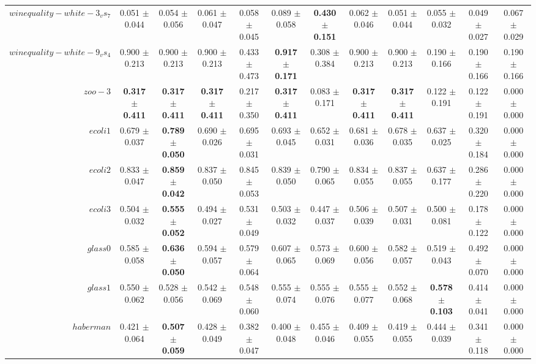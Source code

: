 \begin{table}[!ht]
{\begin{tabular}{r c c c c c c c c c c c}
$winequality-white-3_vs_7$ & 0.051 $\pm$ 0.044 & 0.054 $\pm$ 0.056 & 0.061 $\pm$ 0.047 & 0.058 $\pm$ 0.045 & 0.089 $\pm$ 0.058 & \textbf{0.430 $\pm$ 0.151} & 0.062 $\pm$ 0.046 & 0.051 $\pm$ 0.044 & 0.055 $\pm$ 0.032 & 0.049 $\pm$ 0.027 & 0.067 $\pm$ 0.029 \\
$winequality-white-9_vs_4$ & 0.900 $\pm$ 0.213 & 0.900 $\pm$ 0.213 & 0.900 $\pm$ 0.213 & 0.433 $\pm$ 0.473 & \textbf{0.917 $\pm$ 0.171} & 0.308 $\pm$ 0.384 & 0.900 $\pm$ 0.213 & 0.900 $\pm$ 0.213 & 0.190 $\pm$ 0.166 & 0.190 $\pm$ 0.166 & 0.190 $\pm$ 0.166 \\
$zoo-3$ & \textbf{0.317 $\pm$ 0.411} & \textbf{0.317 $\pm$ 0.411} & \textbf{0.317 $\pm$ 0.411} & 0.217 $\pm$ 0.350 & \textbf{0.317 $\pm$ 0.411} & 0.083 $\pm$ 0.171 & \textbf{0.317 $\pm$ 0.411} & \textbf{0.317 $\pm$ 0.411} & 0.122 $\pm$ 0.191 & 0.122 $\pm$ 0.191 & 0.000 $\pm$ 0.000 \\
$ecoli1$ & 0.679 $\pm$ 0.037 & \textbf{0.789 $\pm$ 0.050} & 0.690 $\pm$ 0.026 & 0.695 $\pm$ 0.031 & 0.693 $\pm$ 0.045 & 0.652 $\pm$ 0.031 & 0.681 $\pm$ 0.036 & 0.678 $\pm$ 0.035 & 0.637 $\pm$ 0.025 & 0.320 $\pm$ 0.184 & 0.000 $\pm$ 0.000 \\
$ecoli2$ & 0.833 $\pm$ 0.047 & \textbf{0.859 $\pm$ 0.042} & 0.837 $\pm$ 0.050 & 0.845 $\pm$ 0.053 & 0.839 $\pm$ 0.050 & 0.790 $\pm$ 0.065 & 0.834 $\pm$ 0.055 & 0.837 $\pm$ 0.055 & 0.637 $\pm$ 0.177 & 0.286 $\pm$ 0.220 & 0.000 $\pm$ 0.000 \\
$ecoli3$ & 0.504 $\pm$ 0.032 & \textbf{0.555 $\pm$ 0.052} & 0.494 $\pm$ 0.027 & 0.531 $\pm$ 0.049 & 0.503 $\pm$ 0.032 & 0.447 $\pm$ 0.037 & 0.506 $\pm$ 0.039 & 0.507 $\pm$ 0.031 & 0.500 $\pm$ 0.081 & 0.178 $\pm$ 0.122 & 0.000 $\pm$ 0.000 \\
$glass0$ & 0.585 $\pm$ 0.058 & \textbf{0.636 $\pm$ 0.050} & 0.594 $\pm$ 0.057 & 0.579 $\pm$ 0.064 & 0.607 $\pm$ 0.065 & 0.573 $\pm$ 0.069 & 0.600 $\pm$ 0.056 & 0.582 $\pm$ 0.057 & 0.519 $\pm$ 0.043 & 0.492 $\pm$ 0.070 & 0.000 $\pm$ 0.000 \\
$glass1$ & 0.550 $\pm$ 0.062 & 0.528 $\pm$ 0.056 & 0.542 $\pm$ 0.069 & 0.548 $\pm$ 0.060 & 0.555 $\pm$ 0.074 & 0.555 $\pm$ 0.076 & 0.555 $\pm$ 0.077 & 0.552 $\pm$ 0.068 & \textbf{0.578 $\pm$ 0.103} & 0.414 $\pm$ 0.041 & 0.000 $\pm$ 0.000 \\
$haberman$ & 0.421 $\pm$ 0.064 & \textbf{0.507 $\pm$ 0.059} & 0.428 $\pm$ 0.049 & 0.382 $\pm$ 0.047 & 0.400 $\pm$ 0.048 & 0.455 $\pm$ 0.046 & 0.409 $\pm$ 0.055 & 0.419 $\pm$ 0.055 & 0.444 $\pm$ 0.039 & 0.341 $\pm$ 0.118 & 0.000 $\pm$ 0.000 \\

\end{tabular}}
\end{table}

